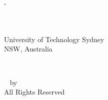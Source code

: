 \begin{titlingpage}
{\begin{adjustwidth*}{\unitlength}{-\unitlength}
\begin{center}
\vspace {10mm}
{\normalsize \utsschool\\
\vspace {1mm}
\normalsize \utsfaculty \\
\vspace {2mm}
{\large University of Technology Sydney}\\
\vspace {1mm}
{NSW, Australia}
}\\
\vspace{13mm}

{\normalsize{\DTMenglishmonthname{\utsmonth}~\utsyear}}
\end{center}
\end{adjustwidth*}

\clearpage

\pagestyle{empty}
\null\vfill
\begin{center}
  {\textcopyright}~{\utsyear} by \href{utsurl}{\utsname}
  \\All Rights Reserved
\end{center}
}
\end{titlingpage}